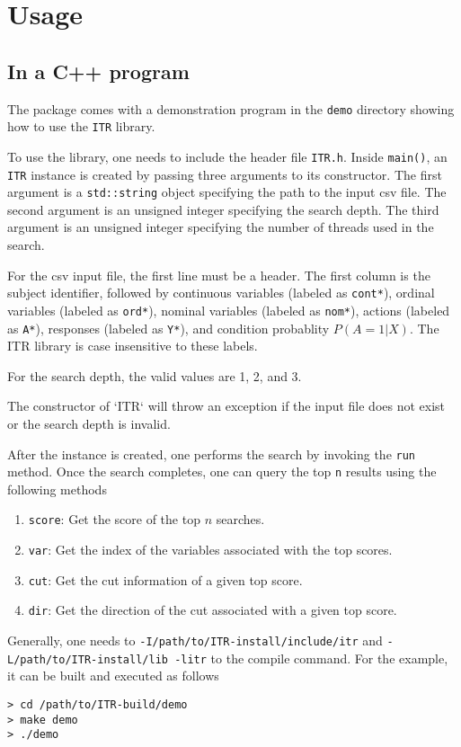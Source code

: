 \chapter{Usage}

\section{In a C++ program} 

The package comes with a demonstration program in the {\tt demo} directory
showing how to use the {\tt ITR} library.

To use the library, one needs to include the header file {\tt ITR.h}. Inside
{\tt main()}, an {\tt ITR} instance is created by passing three arguments to
its constructor. The first argument is a {\tt std::string} object specifying the
path to the input csv file. The second argument is an unsigned integer specifying the search depth. The third argument is an unsigned integer specifying the number of threads used in the search. 

For the csv input file, the first line must be a header. The first column is the
subject identifier, followed by continuous variables (labeled as {\tt cont*}), ordinal
variables (labeled as {\tt ord*}), nominal variables (labeled as {\tt nom*}),
actions (labeled as {\tt A*}), responses (labeled as {\tt Y*}), and condition
probablity $P(A = 1 | X)$. The ITR library is case insensitive to these labels.

For the search depth, the valid values are 1, 2, and 3.   

The constructor of `ITR` will throw an exception if the input file does not
exist or the search depth is invalid. 

After the instance is created, one performs the search by invoking the {\tt run}
method. Once the search completes, one can query the top {\tt n} results using
the following methods

\begin{enumerate}
\item {\tt score}: Get the score of the top $n$ searches.
\item {\tt var}: Get the index of the variables associated with the top scores.
\item {\tt cut}: Get the cut information of a given top score.
\item {\tt dir}: Get the direction of the cut associated with a given top score.
\end{enumerate}

Generally, one needs to {\tt -I/path/to/ITR-install/include/itr} and
{\tt -L/path/to/ITR-install/lib -litr} to the compile command.  For the example,
it can be built and executed as follows
\begin{verbatim}
> cd /path/to/ITR-build/demo
> make demo
> ./demo
\end{verbatim}

